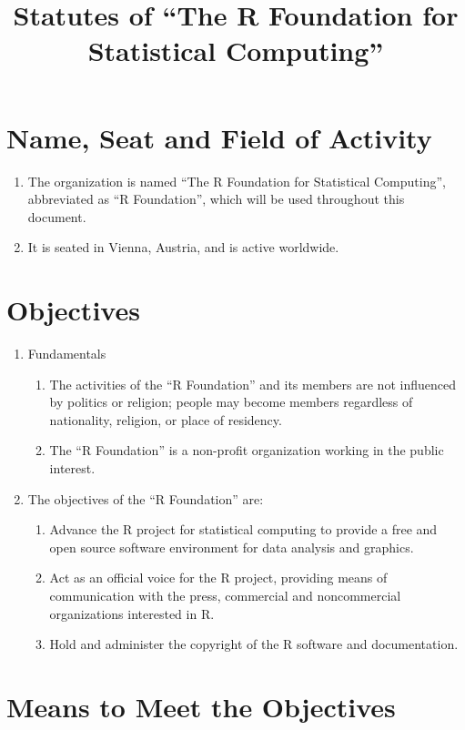 \documentclass[a4paper]{article}
\title{\bf Statutes of
  ``The R Foundation for Statistical Computing''}
\newcommand{\RF}{``R Foundation''}
\begin{document}
\maketitle

\section{Name, Seat and Field of Activity}

\begin{enumerate}
  \item The organization is named ``The R Foundation for Statistical
   Computing'', abbreviated as \RF{}, which will be used
   throughout this document.
 \item It is seated in Vienna, Austria, and is active worldwide.
\end{enumerate}

\section{Objectives}

\begin{enumerate}
 \item Fundamentals
  \begin{enumerate}
   \item The activities of the \RF{} and its members are not
    influenced by politics or religion; people may become members
    regardless of nationality, religion, or place of residency.
   \item The \RF{} is a non-profit organization working in
    the public interest.
  \end{enumerate}
 \item The objectives of the \RF{} are:
  \begin{enumerate}
   \item Advance the R project for statistical computing to provide a
    free and open source software environment for data analysis and
    graphics. 
   \item Act as an official voice for the R project, providing means of
    communication with the press, commercial and noncommercial
    organizations interested in R.
   \item Hold and administer the copyright of the R software and
    documentation.
  \end{enumerate}
\end{enumerate}

\section{Means to Meet the Objectives}
\end{document}
